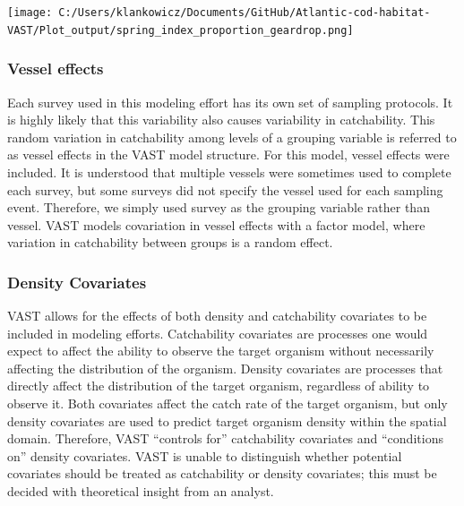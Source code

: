 \documentclass[
]{article}
\let\origfigure\figure
\let\endorigfigure\endfigure
\renewenvironment{figure}[1][2] {
    \expandafter\origfigure\expandafter[H]
} {
    \endorigfigure
}
\begin{document}
\begin{figure}
\centering
\texttt{[image: C:/Users/klankowicz/Documents/GitHub/Atlantic-cod-habitat-VAST/Plot\_output/spring\_index\_proportion\_geardrop.png]}
\caption{Figure 4: Proportional comparison of spring cod abundance by age group, using model runs with all available data as the control.}
\end{figure}

\hypertarget{vessel-effects}{%
\subsubsection{Vessel effects}\label{vessel-effects}}

Each survey used in this modeling effort has its own set of sampling protocols. It is highly likely that this variability also causes variability in catchability. This random variation in catchability among levels of a grouping variable is referred to as vessel effects in the VAST model structure. For this model, vessel effects were included. It is understood that multiple vessels were sometimes used to complete each survey, but some surveys did not specify the vessel used for each sampling event. Therefore, we simply used survey as the grouping variable rather than vessel. VAST models covariation in vessel effects with a factor model, where variation in catchability between groups is a random effect.

\hypertarget{density-covariates}{%
\subsubsection{Density Covariates}\label{density-covariates}}

VAST allows for the effects of both density and catchability covariates to be included in modeling efforts. Catchability covariates are processes one would expect to affect the ability to observe the target organism without necessarily affecting the distribution of the organism. Density covariates are processes that directly affect the distribution of the target organism, regardless of ability to observe it. Both covariates affect the catch rate of the target organism, but only density covariates are used to predict target organism density within the spatial domain. Therefore, VAST ``controls for'' catchability covariates and ``conditions on'' density covariates. VAST is unable to distinguish whether potential covariates should be treated as catchability or density covariates; this must be decided with theoretical insight from an analyst.
\end{document}

